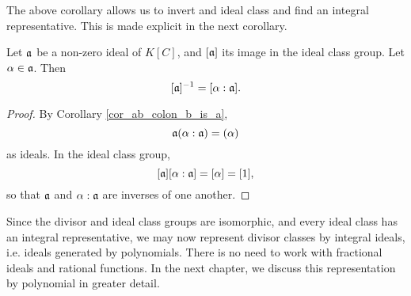 The above corollary allows us to invert and ideal class and find an integral representative.
This is made explicit in the next corollary.

\begin{corollary}
  \label{cor_integral_ideal_inverse}
  Let $\frak a$ be a non-zero ideal of $K[C]$,
  and $[\frak a]$ its image in the ideal class group.
  Let $\alpha \in \frak a$. Then
  \[ [\frak a]^{-1} = [\alpha : \frak a]. \]
\end{corollary}
\begin{proof}
  By Corollary \ref{cor_ab_colon_b_is_a},
  \[ \frak a(\alpha : \frak a) = (\alpha) \]
  as ideals.
  In the ideal class group,
  \[ [\frak a][\alpha : \frak a] = [\alpha] = [1], \]
  so that $\frak a$ and $\alpha : \frak a$ are inverses of one another.
\end{proof}

Since the divisor and ideal class groups are isomorphic, and every ideal class has an integral representative,
we may now represent divisor classes by integral ideals, i.e. ideals generated by polynomials.
There is no need to work with fractional ideals and rational functions.
In the next chapter, we discuss this representation by polynomial in greater detail.
